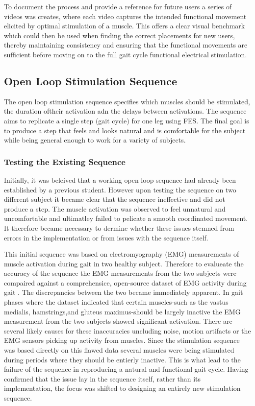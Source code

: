 To document the process and provide a reference for future users a series of videos was creates, where each video captures the intended functional movement elicited by optimal stimulation of a muscle. This offers a clear visual benchmark which could then be used when finding the correct placements for new users, thereby maintaining consistency and ensuring that the functional movements are sufficient before moving on to the full gait cycle functional electrical stimulation.

\subsection{Open Loop Stimulation Sequence}
The open loop stimulation sequence specifies which muscles should be stimulated, the duration oftheir activation adn the delays between activations. The sequence aims to replicate a single step (gait cycle) for one leg using FES. The final goal is to produce a step that feels and looks natural and is comfortable for the subject while being general enough to work for a variety of subjects.

\subsubsection{Testing the Existing Sequence}
Initially, it was beleived that a working open loop sequence had already been established by a previous student. However upon testing the sequence on two different subject it became clear that the sequence ineffective and did not produce a step. The muscle activation was observed to feel unnatural and uncomfortable and ultimatley failed to pelicate a smooth coordinated movement. It therefore became necessary to dermine whether these issues stemned from errors in the implementation or from issues with the sequence itself.


This initial sequence was based on electromyography (EMG) measurements of muscle activation during gait in two healthy subject. Therefore to evalueate the accuracy of the sequence the EMG measurements from the two subjects were compaired against a comprehensice, open-source dataset of EMG activity during gait \cite{camargo_comprehensive_2021}. The discrepancies between the two became immediately apparent. In gait phases where the dataset indicated that certain muscles-such as the vastus medialis, hamstrings,and gluteus maximus-should be largely inactive the EMG measurement from the two subjects showed significant activation. There are several likely causes for these inaccuracies uncluding noise, motion artifacts or the EMG sensors picking up activity from muscles. Since the stimulation sequence was based directly on this flawed data several muscles were being stimulated during periods where they should be entierly inactive. This is what lead to the failure of the sequence in reproducing a natural and functional gait cycle. Having confirmed that the issue lay in the sequence itself, rather than its implementation, the focus was shifted to designing an entirely new stimulation sequence.


